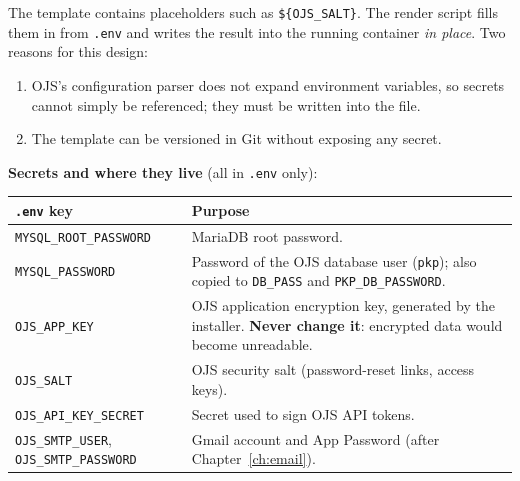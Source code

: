 \documentclass[11pt,a4paper]{report}
\newcommand{\code}[1]{\texttt{\small #1}}
\newcommand{\file}[1]{\texttt{\small #1}}
\begin{document}
The template contains placeholders such as \code{\$\{OJS\_SALT\}}. The render script fills them
in from \file{.env} and writes the result into the running container \emph{in place}. Two reasons
for this design:
\begin{enumerate}
  \item OJS's configuration parser does not expand environment variables, so secrets cannot
        simply be referenced; they must be written into the file.
  \item The template can be versioned in Git without exposing any secret.
\end{enumerate}

\textbf{Secrets and where they live} (all in \file{.env} only):
\begin{tabularx}{\linewidth}{@{}P{4.6cm}L@{}}
\toprule
\textbf{\file{.env} key} & \textbf{Purpose} \\
\midrule
\code{MYSQL\_ROOT\_PASSWORD} & MariaDB root password. \\
\code{MYSQL\_PASSWORD}       & Password of the OJS database user (\code{pkp}); also copied to \code{DB\_PASS} and \code{PKP\_DB\_PASSWORD}. \\
\code{OJS\_APP\_KEY}          & OJS application encryption key, generated by the installer. \textbf{Never change it}: encrypted data would become unreadable. \\
\code{OJS\_SALT}              & OJS security salt (password-reset links, access keys). \\
\code{OJS\_API\_KEY\_SECRET}  & Secret used to sign OJS API tokens. \\
\code{OJS\_SMTP\_USER}, \code{OJS\_SMTP\_PASSWORD} & Gmail account and App Password (after Chapter~\ref{ch:email}). \\
\bottomrule
\end{tabularx}
\end{document}
